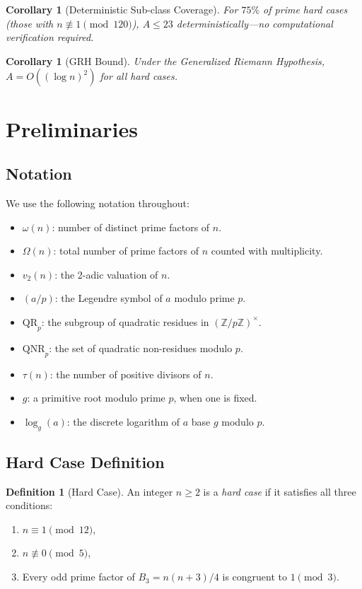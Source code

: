 \documentclass[11pt,a4paper]{article}
\theoremstyle{plain}
\newtheorem{corollary}[theorem]{Corollary}
\theoremstyle{plain}
\theoremstyle{definition}
\newtheorem{definition}[theorem]{Definition}
\numberwithin{equation}{section}
\begin{document}
\begin{corollary}[Deterministic Sub-class Coverage]
For $75\%$ of prime hard cases (those with $n \not\equiv 1 \pmod{120}$), $A \leq 23$ deterministically---no computational verification required.
\end{corollary}

\begin{corollary}[GRH Bound]
Under the Generalized Riemann Hypothesis, $A = O((\log n)^2)$ for all hard cases.
\end{corollary}

\section{Preliminaries}

\subsection{Notation}

We use the following notation throughout:
\begin{itemize}[noitemsep]
  \item $\omega(n)$: number of distinct prime factors of $n$.
  \item $\Omega(n)$: total number of prime factors of $n$ counted with multiplicity.
  \item $v_2(n)$: the 2-adic valuation of $n$.
  \item $(a/p)$: the Legendre symbol of $a$ modulo prime $p$.
  \item $\mathrm{QR}_p$: the subgroup of quadratic residues in $(\mathbb{Z}/p\mathbb{Z})^\times$.
  \item $\mathrm{QNR}_p$: the set of quadratic non-residues modulo $p$.
  \item $\tau(n)$: the number of positive divisors of $n$.
  \item $g$: a primitive root modulo prime $p$, when one is fixed.
  \item $\log_g(a)$: the discrete logarithm of $a$ base $g$ modulo $p$.
\end{itemize}

\subsection{Hard Case Definition}

\begin{definition}[Hard Case]
An integer $n \geq 2$ is a \emph{hard case} if it satisfies all three conditions:
\begin{enumerate}[noitemsep]
  \item $n \equiv 1 \pmod{12}$,
  \item $n \not\equiv 0 \pmod{5}$,
  \item Every odd prime factor of $B_3 = n(n+3)/4$ is congruent to $1 \pmod{3}$.
\end{enumerate}
\end{definition}
\end{document}
